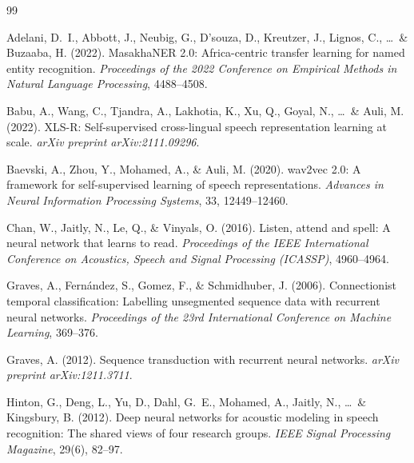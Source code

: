 \documentclass[12pt,a4paper]{article}
\begin{document}


\begin{thebibliography}{99}

Adelani, D.~I., Abbott, J., Neubig, G., D'souza, D., Kreutzer, J., Lignos, C., \ldots\ \& Buzaaba, H. (2022).
\newblock MasakhaNER 2.0: Africa-centric transfer learning for named entity recognition.
\newblock \textit{Proceedings of the 2022 Conference on Empirical Methods in Natural Language Processing}, 4488--4508.

Babu, A., Wang, C., Tjandra, A., Lakhotia, K., Xu, Q., Goyal, N., \ldots\ \& Auli, M. (2022).
\newblock XLS-R: Self-supervised cross-lingual speech representation learning at scale.
\newblock \textit{arXiv preprint arXiv:2111.09296}.

Baevski, A., Zhou, Y., Mohamed, A., \& Auli, M. (2020).
\newblock wav2vec 2.0: A framework for self-supervised learning of speech representations.
\newblock \textit{Advances in Neural Information Processing Systems}, 33, 12449--12460.

Chan, W., Jaitly, N., Le, Q., \& Vinyals, O. (2016).
\newblock Listen, attend and spell: A neural network that learns to read.
\newblock \textit{Proceedings of the IEEE International Conference on Acoustics, Speech and Signal Processing (ICASSP)}, 4960--4964.

Graves, A., Fern{\'a}ndez, S., Gomez, F., \& Schmidhuber, J. (2006).
\newblock Connectionist temporal classification: Labelling unsegmented sequence data with recurrent neural networks.
\newblock \textit{Proceedings of the 23rd International Conference on Machine Learning}, 369--376.

Graves, A. (2012).
\newblock Sequence transduction with recurrent neural networks.
\newblock \textit{arXiv preprint arXiv:1211.3711}.

Hinton, G., Deng, L., Yu, D., Dahl, G.~E., Mohamed, A., Jaitly, N., \ldots\ \& Kingsbury, B. (2012).
\newblock Deep neural networks for acoustic modeling in speech recognition: The shared views of four research groups.
\newblock \textit{IEEE Signal Processing Magazine}, 29(6), 82--97.


\end{thebibliography}
\end{document}
